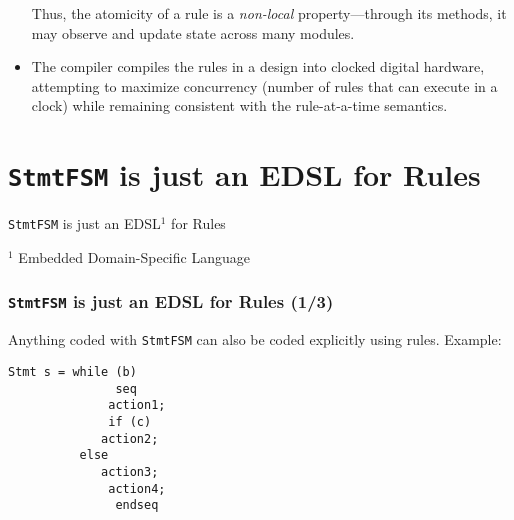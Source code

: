 \begin{frame}[fragile]
\begin{itemize}
       \vspace{1ex}

       Thus, the atomicity of a rule is a \emph{non-local}
       property---through its methods, it may observe and update state
       across many modules.

 \vspace{2ex}

 \item The {\bsc} compiler compiles the rules in a design into clocked
       digital hardware, attempting to maximize concurrency (number of
       rules that can execute in a clock) while remaining consistent
       with the rule-at-a-time semantics.

\end{itemize}

\end{frame}


\section{{\tt StmtFSM} is just an EDSL for Rules}

\begin{frame}

\begin{center}
  {\LARGE {\tt StmtFSM} is just an EDSL$^1$ for Rules}

  \vspace{20ex}

  {\footnotesize $^1$ Embedded Domain-Specific Language}
\end{center}

\end{frame}


\begin{frame}[fragile]
\frametitle{{\tt StmtFSM} is just an EDSL for Rules (1/3)}

\footnotesize

Anything coded with {\tt StmtFSM} can also be coded explicitly using rules.  Example:

\begin{Verbatim}[frame=single]
   Stmt s = while (b)
               seq
	          action1;
	          if (c)
		     action2;
		  else
		     action3;
	          action4;
               endseq
\end{Verbatim}

\end{frame}

